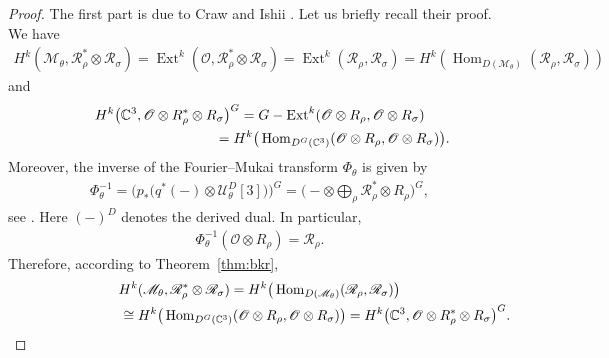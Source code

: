 \documentclass[pdftex]{sigma}
\numberwithin{equation}{section}
\newcommand{\sM}{\mathscr{M}}
\newcommand{\sO}{\mathscr{O}}
\newcommand{\sR}{\mathscr{R}}
\newcommand{\sU}{\mathscr{U}}
\newcommand{\C}{{\mathbb C}}
\newcommand{\Hom}{\operatorname{Hom}}
\newcommand{\iso}{\cong}
\newcommand{\Ext}{\operatorname{Ext}}
\begin{document}
\begin{proof}
  The f\/irst part is due to Craw and Ishii \cite[Lemma~5.4]{Craw2004}.
  Let us brief\/ly recall their proof.  We have
  \begin{gather*}
    H^k(\sM_\theta,\sR_\rho^*\otimes\sR_\sigma)
    =\Ext^k(\sO,\sR_\rho^*\otimes\sR_\sigma)
     =\Ext^k(\sR_\rho,\sR_\sigma)
    =H^k(\Hom_{D(\sM_{\theta})}(\sR_\rho,\sR_\sigma))
  \end{gather*}
  and
  \begin{gather*}
    H^k\big(\C^3,\sO\otimes R_\rho^* \otimes R_\sigma\big)^G
     =G - \Ext^k(\sO \otimes R_\rho,\sO\otimes R_\sigma)\\
     \hphantom{H^k\big(\C^3,\sO\otimes R_\rho^* \otimes R_\sigma\big)^G}{}
     =H^k\big(\Hom_{D^G(\C^3)}(\sO \otimes R_\rho,\sO\otimes R_\sigma)\big).
  \end{gather*}
  Moreover, the inverse of the Fourier--Mukai transform $\Phi_\theta$
  is given by
  \begin{gather*}
    \Phi_\theta^{-1}
    =\big(p_*\big(q^*(-)\otimes\sU_\theta^D[3]\big)\big)^G
    =\Big({-}\otimes \bigoplus_\rho \sR_\rho^* \otimes R_\rho\Big)^G,
  \end{gather*}
  see \cite[p.~267]{Craw2004}.  Here $(-)^D$ denotes the derived
  dual.  In particular,
  \begin{gather*}%
    \Phi_\theta^{-1}(\sO \otimes R_\rho) = \sR_\rho.
  \end{gather*}
  Therefore, according to Theorem~\ref{thm:bkr},
  \begin{gather*}
    H^k(\sM_\theta,\sR_\rho^*\otimes\sR_\sigma)
     =H^k\big(\Hom_{D(\sM_{\theta})}(\sR_\rho,\sR_\sigma)\big) \\
  \hphantom{H^k(\sM_\theta,\sR_\rho^*\otimes\sR_\sigma)}{}
     \iso H^k\big(\Hom_{D^G(\C^3)}(\sO \otimes R_\rho,\sO\otimes R_\sigma)\big)
     = H^k\big(\C^3,\sO\otimes R_\rho^* \otimes R_\sigma\big)^G.
  \end{gather*}


\end{proof}
\end{document}
